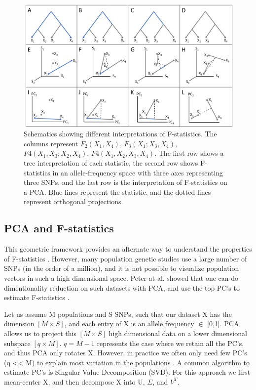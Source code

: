 \documentclass[12pt, letterpaper]{article}
\begin{document}
\begin{figure}[ht!]
    \includegraphics[width=16.5cm]{ppt/overview.png}
    \centering
    \caption{Schematics showing different interpretations of F-statistics. The columns represent $F_2(X_1,X_4)$, $F_3(X_1;X_3,X_4)$, $F4(X_1,X_3;X_2,X_4)$, $F4(X_1,X_2,X_3,X_4)$. The first row shows a tree interpretation of each statistic, the second row shows F-statistics in an allele-frequency space with three axes representing three SNPs, and the last row is the interpretation of F-statistics on a PCA. Blue lines represent the statistic, and the dotted lines represent orthogonal projections.}
    \label{fig2:sim}
\end{figure}


\subsection{PCA and F-statistics}

This geometric framework provides an alternate way to understand the properties of F-statistics \cite{oteo-garcia_geometrical_2021}. However, many population genetic studies use a large number of SNPs (in the order of a million), and it is not possible to visualize population vectors in such a high dimensional space. Peter at al. showed that one can do dimentionality reduction on such datasets with PCA, and use the top PC's to estimate F-statistics \cite{peter_geometric_2022}.

Let us assume M populations and S SNPs, such that our dataset X has the dimension $[M \times S]$, and each entry of X is an allele frequency $\in$ [0,1]. PCA allows us to project this $[M \times S]$ high dimensional data on a lower dimensional subspace $[q \times M]$. $q = M-1$ represents the case where we retain all the PC's, and thus PCA only rotates X. However, in practice we often only need few PC's (q << M) to explain most variation in the populations \cite{peter_geometric_2022}. A common algorithm to estimate PC's is Singular Value Decomposition (SVD). For this approach we first mean-center X, and then decompose X into U, $\Sigma$, and $V^T$.
\end{document}
